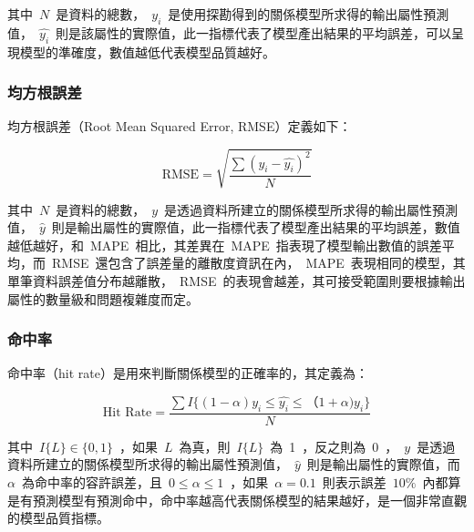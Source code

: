 其中~$N$~是資料的總數，~$y_i$~是使用探勘得到的關係模型所求得的輸出屬性預測值，~$\hat{y_i}$~則是該屬性的實際值，此一指標代表了模型產出結果的平均誤差，可以呈現模型的準確度，數值越低代表模型品質越好。


\subsubsection{均方根誤差}

均方根誤差（Root Mean Squared Error, RMSE）定義如下：

\begin{equation} \text{RMSE} = \sqrt{\dfrac{\sum{(y_i - \hat{y_i})^2}}{N}} \label{eq:RMSE}\end{equation}

其中~$N$~是資料的總數，~$y$~是透過資料所建立的關係模型所求得的輸出屬性預測值，~$\hat{y}$~則是輸出屬性的實際值，此一指標代表了模型產出結果的平均誤差，數值越低越好，和~MAPE~相比，其差異在~MAPE~指表現了模型輸出數值的誤差平均，而~RMSE~還包含了誤差量的離散度資訊在內，~MAPE~表現相同的模型，其單筆資料誤差值分布越離散，~RMSE~的表現會越差，其可接受範圍則要根據輸出屬性的數量級和問題複雜度而定。


\subsubsection{命中率}

命中率（hit rate）是用來判斷關係模型的正確率的，其定義為：

\begin{equation} \text{Hit Rate} = \dfrac{ \sum{I\{(1 - \alpha)y_i \le \hat{y_i} \le（1 + \alpha)y_i \}} }{N} \label{eq:hitrate}\end{equation} 

其中~$I\{L\} \in \{0, 1\}$~，如果~$L$~為真，則~$I\{L\}$~為~1~，反之則為~0~，~$y$~是透過資料所建立的關係模型所求得的輸出屬性預測值，~$\hat{y}$~則是輸出屬性的實際值，而~$\alpha$~為命中率的容許誤差，且~$0 \le \alpha \le 1$~，如果~$\alpha = 0.1$~則表示誤差~$10\%$~內都算是有預測模型有預測命中，命中率越高代表關係模型的結果越好，是一個非常直觀的模型品質指標。

